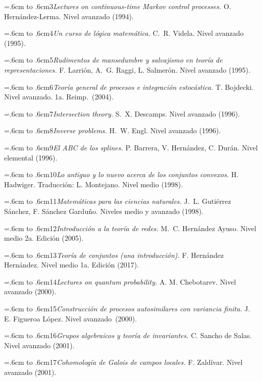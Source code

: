 \documentclass[10pt,pagesize]{scrbook}
\numberwithin{equation}{chapter}
\def\bibl#1{\hangindent=.6cm \noindent \hbox to .6cm{#1\hfill}}
\begin{document}
\bibl{\hbox{\hskip3.5pt}3}{\itshape Lectures on continuous-time Markov control processes.}
O. Hernández-Lerma. 
Nivel avanzado
(1994). %

\bibl{\hbox{\hskip3.5pt}4}{\itshape Un curso de lógica matemática.} 
C.$\!$~R. Videla. 
Nivel avanzado 
(1995). %

\bibl{\hbox{\hskip3.5pt}5}{\itshape Rudimentos de mansedumbre y salvajismo en
teoría de representaciones.} 
F. Larrión, A.$\!$~G. Raggi, L. Salmerón. 
Nivel avanzado
(1995). %

\bibl{\hbox{\hskip3.5pt}6}{\itshape Teoría general de procesos e integración
estocástica.} 
T. Bojdecki. 
Nivel avanzado.
1a. Reimp.~(2004).

\bibl{\hbox{\hskip3.5pt}7}{\itshape Intersection theory.} 
S.$\!$~X. Descamps. 
Nivel avanzado 
(1996). %

\bibl{\hbox{\hskip3.5pt}8}{\itshape Inverse problems.} 
H.$\!$~W. Engl. 
Nivel avanzado
(1996). %

\bibl{\hbox{\hskip3.5pt}9}{\itshape El ABC de los splines.} 
P. Barrera, V. Hernández, C. Durán. 
Nivel elemental
(1996). %

\bibl{10}{\itshape Lo antiguo y lo nuevo acerca de los conjuntos
convexos.} 
H. Hadwiger. 
Traducción: L. Montejano.
Nivel medio 
(1998). %

\bibl{11}{\itshape Matemáticas para las ciencias naturales.}
J.$\!$~L. Gutiérrez Sánchez, F. Sánchez Garduño.
Niveles medio y avanzado 
(1998). %

\bibl{12}{\itshape Introducción a la teoría de redes.}
M.$\!$~C. Hernández Ayuso. 
Nivel medio
2a. Edición
(2005).

\bibl{13}{\itshape Teoría de conjuntos (una introducción).}
F. Hernández Hernández.
Nivel medio
1a. Edición
(2017).

\bibl{14}{\itshape Lectures on quantum probability.}
A. M. Chebotarev. 
Nivel avanzado 
(2000). %

\bibl{15}{\itshape Construcción de procesos autosimilares con variancia
  finita.}$\!$
J.$\!$ E. Figueroa López.$\!$
Nivel avanzado~(2000). %

\bibl{16}{\itshape Grupos algebraicos y teoría de invariantes.}
C. Sancho de Salas.
Nivel avanzado
(2001). %

\bibl{17}{\itshape Cohomología de Galois de campos locales.}
F. Zaldívar.
Nivel avanzado
(2001). %
\end{document}
